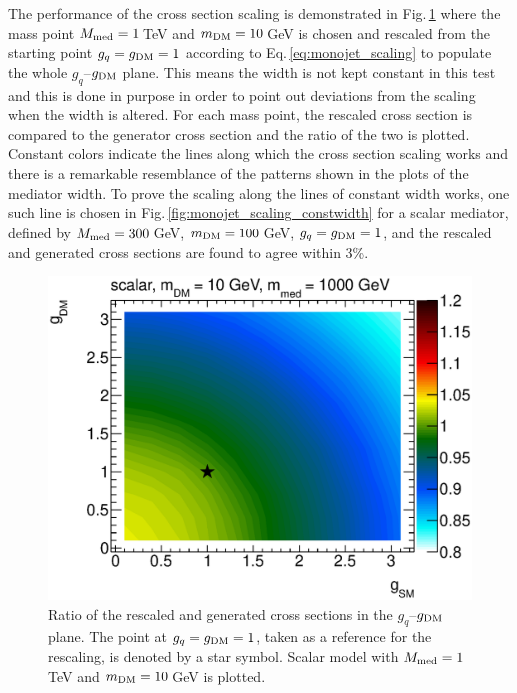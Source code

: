 The performance of the cross section scaling is demonstrated in Fig.\,\ref{fig:monojet_scaling} %
where the mass point $M_{\rm{med}}=1$\,TeV and $m_{\rm{DM}}=10$\,GeV is chosen
and rescaled from the starting point $g_q=g_{\rm{DM}}=1$ according to Eq.\,\ref{eq:monojet_scaling} to populate the whole $g_q$--$g_{\rm{DM}}$ plane. This means the width is not kept constant in this test and this is done in purpose in order to point out deviations from the scaling when the width is altered. For each mass point, the rescaled cross section is compared to the generator cross section and the ratio of the two is plotted.
Constant colors indicate the lines along which the cross section scaling works and there is a remarkable resemblance of the patterns shown in the plots of the mediator width. To prove the scaling along the lines of constant width works, one such line is chosen in Fig.\,\ref{fig:monojet_scaling_constwidth} for a scalar mediator, defined by $M_{\rm{med}}=300$\,GeV, $m_{\rm{DM}}=100$\,GeV, $g_q=g_{\rm{DM}}=1$, and the rescaled and generated cross sections are found to agree within 3\%.


\begin{figure}
\centering
\includegraphics[width=0.9\linewidth]{figures/monojet/scaling_S_10_1000.eps}
\caption{Ratio of the rescaled and generated cross sections in the $g_q$--$g_{\rm{DM}}$ plane. The point at $g_q=g_{\rm{DM}}=1$, taken as a reference for the rescaling, is denoted by a star symbol.
Scalar model with $M_{\rm{med}}=1$\,TeV and $m_{\rm{DM}}=10$\,GeV is plotted.}
\label{fig:monojet_scaling}
\end{figure}

